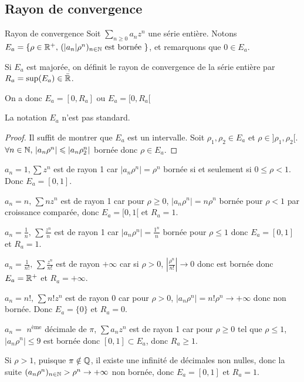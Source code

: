 \subsection{Rayon de convergence }

\begin{theoreme}{Rayon de convergence}{}
    Soit $\sum_{n \geqslant 0} a_n z^n$ une série entière. Notons $E_a = \{\rho \in \mathbb{R}^+, \, (|a_n|\rho^n)_{n \in \mathbb{N}} \text{ est bornée }\}$,
    et remarquons que $0 \in E_a$.

    \svspace Si $E_a$ est majorée, on définit le rayon de convergence de la série entière par $R_a = \sup(E_a) \in \bar {\mathbb{R}}$.

    On a donc $E_a = [0, R_a]$ ou $E_a = [0, R_a[$ 
\end{theoreme}

\begin{remarque}
    La notation $E_a$ n'est pas standard.
\end{remarque}


\begin{proof}
    Il suffit de montrer que $E_a$ est un intervalle. Soit $\rho_1, \rho_2 \in E_a$ et 
    $\rho \in ]\rho_1, \rho_2[$. $\forall n \in \mathbb{N}, \, |a_n \rho^n| \leqslant |a_n \rho_2^n|$ bornée donc $\rho \in E_a$.


\end{proof}



\begin{exemple}
    $a_n = 1, \sum z^n$ est de rayon 1 car $|a_n \rho^n| = \rho^n$ bornée si et seulement si $0 \leqslant \rho < 1$.
    Donc $E_a = [0, 1]$. 

    \lvspace $a_n = n, \, \sum n z^n$ est de rayon 1 car pour $\rho \geqslant 0$, $|a_n \rho^n| = n \rho^n$ bornée
    pour $\rho < 1$ par croissance comparée, donc $E_a = [0, 1[$ et $R_a = 1$.

    \lvspace $a_n = \frac 1 n, \, \sum \frac{z^n}{n}$ est de rayon 1 car 
    $|a_n \rho^n| = \frac{1^n} n $ bornée pour $\rho \leqslant 1$ donc $E_a = [0, 1]$ et $R_a = 1$.

    \lvspace $a_n = \frac 1 {n!}, \, \sum \frac{z^n}{n!}$ est de rayon $+\infty$ car
    si $\rho > 0$, $|\frac{\rho^n} {n!}| \to 0$ donc est bornée donc 
    $E_a = \mathbb{R}^+$ et $R_a = +\infty$.
    
    \lvspace $a_n = n!, \, \sum n! z^n$ est de rayon 0 car pour $\rho > 0$,
    $|a_n \rho^n| = n! \rho^n \to +\infty$ donc non bornée. Donc $E_a = \{0\}$ et $R_a = 0$.

    \lvspace $a_n = $ $n^{\text{ème}}$ décimale de $\pi$, $\sum a_n z^n$ est de rayon 1 car
    pour $\rho \geqslant 0$ tel que $\rho \leqslant 1$, $|a_n \rho^n| \leqslant 9$ est bornée 
    donc $[0, 1] \subset E_a$, donc $R_a \geqslant 1$.

    Si $\rho > 1$, puisque $\pi \notin \mathbb{Q}$, il existe une infinité de décimales non nulles, 
    donc la suite $(a_n \rho^n)_{n \in \mathbb{N}} > \rho^n \to + \infty $ non bornée, 
    donc $E_a = [0, 1]$ et $R_a = 1$. 
\end{exemple}


